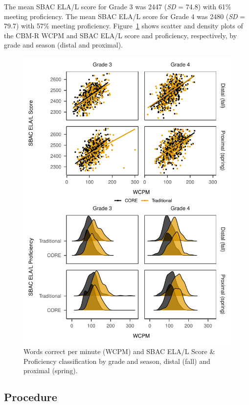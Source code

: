 \documentclass[
  english,
  man, fleqn, noextraspace]{apa6}
\begin{document}
The mean SBAC ELA/L score for Grade 3 was 2447 (\emph{SD} = 74.8) with 61\% meeting proficiency. The mean SBAC ELA/L score for Grade 4 was 2480 (\emph{SD} = 79.7) with 57\% meeting proficiency. Figure~\ref{fig:fig-sbac-scatter} shows scatter and density plots of the CBM-R WCPM and SBAC ELA/L score and proficiency, respectively, by grade and season (distal and proximal).



\begin{figure}
\centering
\includegraphics{demo_files/figure-latex/fig-sbac-scatter-1.pdf}
\caption{\label{fig:fig-sbac-scatter}Words correct per minute (WCPM) and SBAC ELA/L Score \& Proficiency classification by grade and season, distal (fall) and proximal (spring).}
\end{figure}

\hypertarget{procedure}{%
\subsection{Procedure}\label{procedure}}
\end{document}
